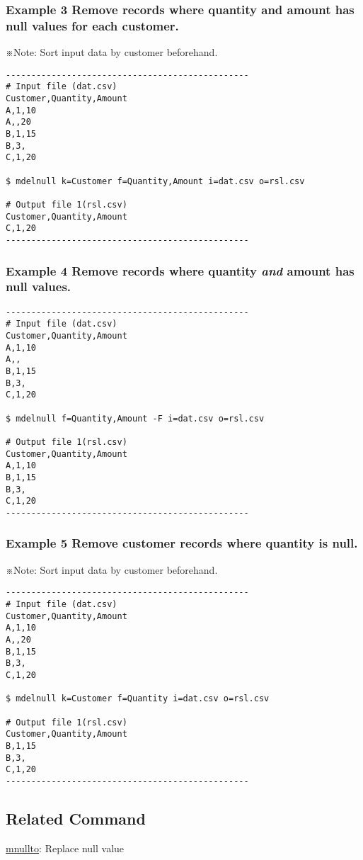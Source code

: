\documentclass[a4paper]{jarticle}
\begin{document}
\subsubsection*{Example 3 Remove records where quantity and amount has null values for each customer. 
}
※Note: Sort input data by customer beforehand. \\

\begin{verbatim}
------------------------------------------------
# Input file (dat.csv)
Customer,Quantity,Amount
A,1,10
A,,20
B,1,15
B,3,
C,1,20

$ mdelnull k=Customer f=Quantity,Amount i=dat.csv o=rsl.csv

# Output file 1(rsl.csv)
Customer,Quantity,Amount
C,1,20
------------------------------------------------
\end{verbatim}

\subsubsection*{Example 4 Remove records where quantity \emph{and} amount has null values. 
}

\begin{verbatim}
------------------------------------------------
# Input file (dat.csv)
Customer,Quantity,Amount
A,1,10
A,,
B,1,15
B,3,
C,1,20

$ mdelnull f=Quantity,Amount -F i=dat.csv o=rsl.csv

# Output file 1(rsl.csv)
Customer,Quantity,Amount
A,1,10
B,1,15
B,3,
C,1,20
------------------------------------------------
\end{verbatim}

\subsubsection*{Example 5 Remove customer records where quantity is null. 
}
※Note: Sort input data by customer beforehand. \\ 

\begin{verbatim}
------------------------------------------------
# Input file (dat.csv)
Customer,Quantity,Amount
A,1,10
A,,20
B,1,15
B,3,
C,1,20

$ mdelnull k=Customer f=Quantity i=dat.csv o=rsl.csv

# Output file 1(rsl.csv)
Customer,Quantity,Amount
B,1,15
B,3,
C,1,20
------------------------------------------------
\end{verbatim}

\subsection*{Related Command}
\noindent
\href{run:mnullto.pdf}{mnullto}: Replace null value \\
\end{document}
